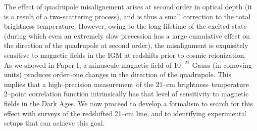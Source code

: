 The effect of quadrupole misalignement arises at second order in optical depth (it is a result of a two-scattering process), and is thus a small correction to the total brightness temperature. However, owing to the long lifetime of the excited state (during which even an extremely slow precession has a large cumulative effect on the direction of the quadrupole at second order), the misalignment is exquisitely sensitive to magnetic fields in the IGM at redshifts prior to cosmic reionization. As we showed in Paper I, a minuscule magnetic field of  $10^{-21}$ Gauss (in comoving units) produces order--one changes in the direction of the quadrupole. This implies that a high--precision measurement of the 21--cm brightness--temperature 2--point correlation function intrinsically has that level of sensitivity to magnetic fields in the Dark Ages. We now proceed to develop a formalism to search for this effect with surveys of the redshifted 21--cm line, and to identifying experimental setups that can achieve this goal. 